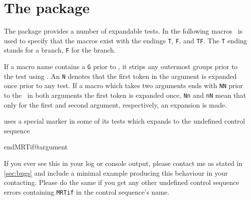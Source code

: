 \chapter{The  package}
The  package provides a number of expandable tests. In the following
macros \tfarg\ is used to specify that the macros exist with the endings
\texttt{T}, \texttt{F}, and \texttt{TF}. The \texttt{T} ending stands for a
 branch, \texttt{F} for the  branch.

If a macro name contains a \texttt{G} prior to \tfarg, it strips any outermost
groups prior to the test using . An \texttt{N} denotes that the
first token in the argument is expanded once prior to any test. If a macro which
takes two arguments ends with \texttt{NN} prior to the \tfarg\ in both arguments
the first token is expanded once, \texttt{Nn} and \texttt{nN} mean that only for
the first and second argument, respectively, an expansion is made.

 uses a special marker in some of its tests which expands to the
undefined control sequence
\begin{center}
  \ttfamily
  \detokenize\expandafter\expandafter\expandafter
    {\csname endMRTif@argument\endcsname}%
\end{center}
If you ever see this in your log or console output, please contact me as stated
in \autoref{sec:bugs} and include a minimal example producing this behaviour in
your contacting. Please do the same if you get any other undefined control
sequence errors containing \texttt{MRTif} in the control sequence's name.

